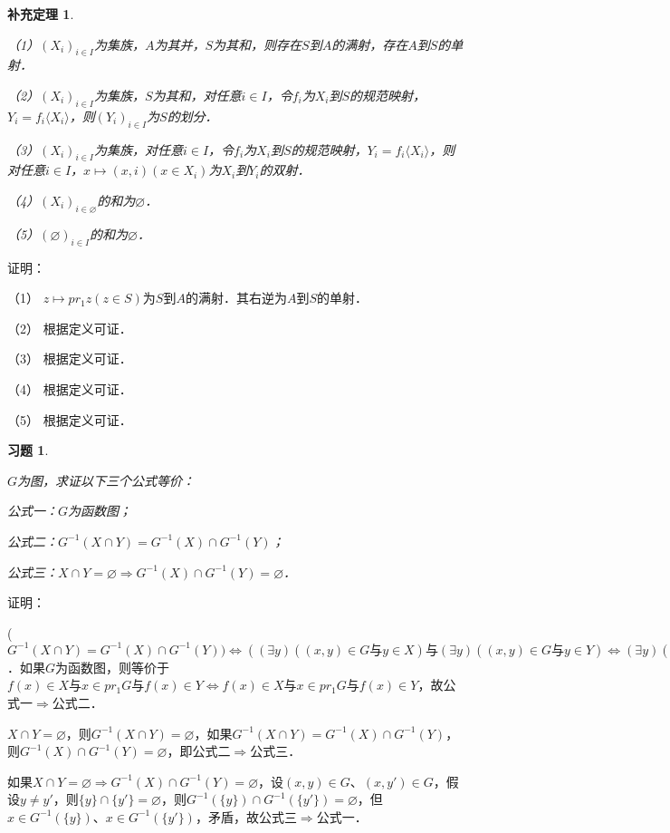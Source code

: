 \documentclass[12pt, a4paper, oneside]{book}
\newtheorem{cor}{补充定理}
\newtheorem{exer}{习题}
\begin{document}
			\begin{cor}\label{cor116}
				\hfill\par
				（1）$(X_i)_{i\in I}$为集族，$A$为其并，$S$为其和，则存在$S$到$A$的满射，存在$A$到$S$的单射．
				\par
				（2）$(X_i)_{i\in I}$为集族，$S$为其和，对任意$i\in I$，令$f_i$为$X_i$到$S$的规范映射，$Y_i=f_i\langle X_i\rangle$，则$(Y_i)_{i\in I}$为$S$的划分．
				\par
				（3）$(X_i)_{i\in I}$为集族，对任意$i\in I$，令$f_i$为$X_i$到$S$的规范映射，$Y_i=f_i\langle X_i\rangle$，则对任意$i\in I$，$x\mapsto (x, i)(x\in X_i)$为$X_i$到$Y_i$的双射．
				\par
				（4）$(X_i)_{i\in \varnothing}$的和为$\varnothing$．
				\par
				（5）$(\varnothing)_{i\in I}$的和为$\varnothing$．
			\end{cor}
			证明：
			\par
			（1）	$z\mapsto pr_1z(z\in S)$为$S$到$A$的满射．其右逆为$A$到$S$的单射．
			\par
			（2）	根据定义可证．
			\par
			（3）	根据定义可证．
			\par
			（4）	根据定义可证．
			\par
			（5）	根据定义可证．

			\begin{exer}\label{exer54}
				\hfill\par
				$G$为图，求证以下三个公式等价：
				\par
				公式一：$G$为函数图；
				\par
				公式二：$G^{-1}(X\cap Y)=G^{-1}(X)\cap G^{-1}(Y)$；
				\par
				公式三：$X\cap Y=\varnothing\Rightarrow G^{-1}(X)\cap G^{-1}(Y)=\varnothing$．
			\end{exer}
			证明：
			\par
			($G^{-1}(X\cap Y)= G^{-1}(X)\cap G^{-1}(Y))\Leftrightarrow ((\exists y)((x, y)\in G\text{与}y\in X)\text{与}(\exists y)((x, y)\in G\text{与}y\in Y)\Leftrightarrow (\exists y) ((x, y)\in G\text{与}y\in X\text{与}y\in Y))$．如果$G$为函数图，则等价于$f(x)\in X\text{与}x\in pr_1G\text{与}f(x)\in Y\Leftrightarrow f(x)\in X\text{与}x\in pr_1G\text{与}f(x)\in Y$，故公式一$\Rightarrow$公式二．
			\par
			$X\cap Y=\varnothing$，则$G^{-1}(X\cap Y)=\varnothing$，如果$G^{-1}(X\cap Y)=G^{-1}(X)\cap G^{-1}(Y)$，则$G^{-1}(X)\cap G^{-1}(Y)=\varnothing$，即公式二$\Rightarrow$公式三．
			\par
			如果$X\cap Y=\varnothing\Rightarrow G^{-1}(X)\cap G^{-1}(Y)=\varnothing$，设$(x, y)\in G$、$(x, y')\in G$，假设$y\neq y'$，则$\{y\}\cap \{y'\}=\varnothing$，则$G^{-1}(\{y\})\cap G^{-1}(\{y'\})=\varnothing$，但$x\in G^{-1}(\{y\})$、$x\in G^{-1}(\{y'\})$，矛盾，故公式三$\Rightarrow$公式一．
			
\end{document}
